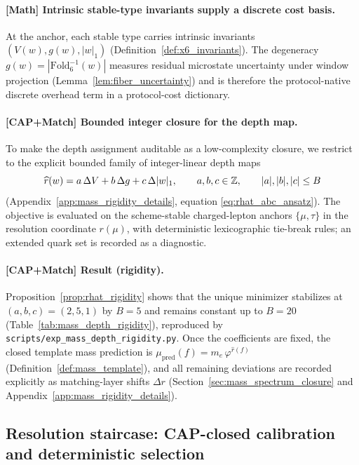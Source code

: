 \paragraph{[Math] Intrinsic stable-type invariants supply a discrete cost basis.}
At the anchor, each stable type carries intrinsic invariants $(V(w),g(w),|w|_1)$ (Definition~\ref{def:x6_invariants}).
The degeneracy $g(w)=|\mathrm{Fold}_6^{-1}(w)|$ measures residual microstate uncertainty under window projection (Lemma~\ref{lem:fiber_uncertainty}) and is therefore the protocol-native discrete overhead term in a protocol-cost dictionary.

\paragraph{[CAP+Match] Bounded integer closure for the depth map.}
To make the depth assignment auditable as a low-complexity closure, we restrict to the explicit bounded family of integer-linear depth maps
\[
\widehat r(w)=a\,\Delta V+b\,\Delta g+c\,\Delta|w|_1,\qquad a,b,c\in\mathbb{Z},\qquad |a|,|b|,|c|\le B
\]
(Appendix~\ref{app:mass_rigidity_details}, equation \eqref{eq:rhat_abc_ansatz}).
The objective is evaluated on the scheme-stable charged-lepton anchors $\{\mu,\tau\}$ in the resolution coordinate $r(\mu)$, with deterministic lexicographic tie-break rules; an extended quark set is recorded as a diagnostic.

\paragraph{[CAP+Match] Result (rigidity).}
Proposition~\ref{prop:rhat_rigidity} shows that the unique minimizer stabilizes at $(a,b,c)=(2,5,1)$ by $B=5$ and remains constant up to $B=20$ (Table~\ref{tab:mass_depth_rigidity}), reproduced by \texttt{scripts/exp\_mass\_depth\_rigidity.py}.
Once the coefficients are fixed, the closed template mass prediction is $\mu_{\mathrm{pred}}(f)=m_e\,\varphi^{\widehat r(f)}$ (Definition~\ref{def:mass_template}), and all remaining deviations are recorded explicitly as matching-layer shifts $\Delta r$ (Section~\ref{sec:mass_spectrum_closure} and Appendix~\ref{app:mass_rigidity_details}).

\subsection{Resolution staircase: CAP-closed calibration and deterministic selection}
\label{subsec:tick_cap_staircase}

